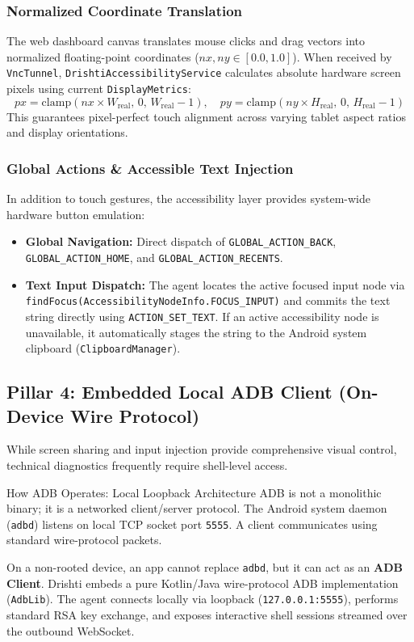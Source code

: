 \documentclass[11pt,a4paper]{article}
\begin{document}
\subsubsection{Normalized Coordinate Translation}
The web dashboard canvas translates mouse clicks and drag vectors into normalized floating-point coordinates ($nx, ny \in [0.0, 1.0]$). When received by \texttt{VncTunnel}, \texttt{DrishtiAccessibilityService} calculates absolute hardware screen pixels using current \texttt{DisplayMetrics}:
\begin{equation}
px = \mathrm{clamp}\left(nx \times W_{\mathrm{real}},\, 0,\, W_{\mathrm{real}} - 1\right), \quad
py = \mathrm{clamp}\left(ny \times H_{\mathrm{real}},\, 0,\, H_{\mathrm{real}} - 1\right)
\end{equation}
This guarantees pixel-perfect touch alignment across varying tablet aspect ratios and display orientations.

\subsubsection{Global Actions \& Accessible Text Injection}
In addition to touch gestures, the accessibility layer provides system-wide hardware button emulation:
\begin{itemize}[leftmargin=*]
    \item \textbf{Global Navigation:} Direct dispatch of \texttt{GLOBAL\_ACTION\_BACK}, \texttt{GLOBAL\_ACTION\_HOME}, and \texttt{GLOBAL\_ACTION\_RECENTS}.
    \item \textbf{Text Input Dispatch:} The agent locates the active focused input node via \texttt{findFocus(AccessibilityNodeInfo.FOCUS\_INPUT)} and commits the text string directly using \texttt{ACTION\_SET\_TEXT}. If an active accessibility node is unavailable, it automatically stages the string to the Android system clipboard (\texttt{ClipboardManager}).
\end{itemize}

\subsection{Pillar 4: Embedded Local ADB Client (On-Device Wire Protocol)}
While screen sharing and input injection provide comprehensive visual control, technical diagnostics frequently require shell-level access.

\begin{archbox}{How ADB Operates: Local Loopback Architecture}
ADB is not a monolithic binary; it is a networked client/server protocol. The Android system daemon (\texttt{adbd}) listens on local TCP socket port \texttt{5555}. A client communicates using standard wire-protocol packets. 

On a non-rooted device, an app cannot replace \texttt{adbd}, but it can act as an \textbf{ADB Client}. Drishti embeds a pure Kotlin/Java wire-protocol ADB implementation (\texttt{AdbLib}). The agent connects locally via loopback (\texttt{127.0.0.1:5555}), performs standard RSA key exchange, and exposes interactive shell sessions streamed over the outbound WebSocket.
\end{archbox}
\end{document}
